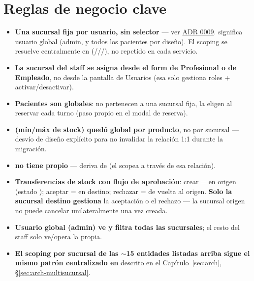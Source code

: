 \section{Reglas de negocio clave}
\label{sec:sucursales-reglas}

\begin{itemize}
  \item \textbf{Una sucursal fija por usuario, sin selector} --- ver \hyperref[adr:0009]{ADR 0009}.  significa usuario global (admin, y todos los pacientes por diseño). El scoping se resuelve centralmente en \allowbreak {}\allowbreak {} (///), no repetido en cada servicio.
  \item \textbf{La sucursal del staff se asigna desde el form de Profesional o de Empleado}, no desde la pantalla de Usuarios (esa solo gestiona roles + activar/desactivar).
  \item \textbf{Pacientes son globales}: no pertenecen a una sucursal fija, la eligen al reservar cada turno (paso propio en el modal de reserva).
  \item \textbf{\allowbreak {}\allowbreak {} (mín/máx de stock) quedó global por producto}, no por sucursal --- desvío de diseño explícito para no invalidar la relación 1:1 durante la migración.
  \item \textbf{ no tiene  propio} --- deriva de  (el \allowbreak {} scopea a través de esa relación).
  \item \textbf{Transferencias de stock con flujo de aprobación}: crear =  en origen (estado ); aceptar =  en destino; rechazar =  de vuelta al origen. \textbf{Solo la sucursal destino gestiona} la aceptación o el rechazo --- la sucursal origen no puede cancelar unilateralmente una vez creada.
  \item \textbf{Usuario global (admin) ve y filtra todas las sucursales}; el resto del staff solo ve/opera la propia.
  \item \textbf{El scoping por sucursal de las $\sim$15 entidades listadas arriba sigue el mismo patrón centralizado en \allowbreak {}\allowbreak {}} descrito en el Capítulo~\ref{sec:arch}, \S\ref{sec:arch-multisucursal}.
\end{itemize}

